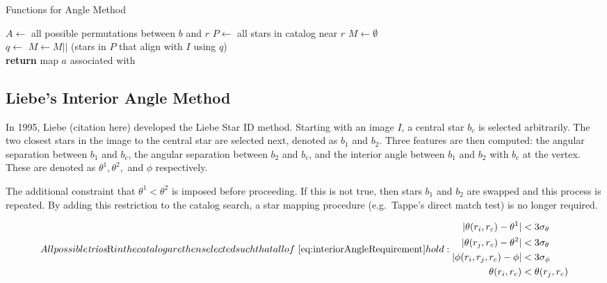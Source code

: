 \begin{algorithm}
    \caption{Functions for Angle Method}\label{algorithm:angleHelper}
    \begin{algorithmic}[1]
        \State $A \gets $ all possible permutations between $b$ and $r$
        \State $P \gets $ all stars in catalog near $r$
        \State $M \gets \emptyset$
        \\
        \State $q \gets $ 
        \State $M \gets M ||$ (stars in $P$ that align with $I$ using $q$)
        \EndFor
        \\
        \State \textbf{return} map $a$ associated with 
        \EndFunction
    \end{algorithmic}
\end{algorithm}

\subsection{Liebe's Interior Angle Method}\label{subsec:liebe'sInteriorAngleMethod}
In 1995, Liebe (citation here) developed the Liebe Star ID method.
Starting with an image $I$, a central star $b_c$ is selected arbitrarily.
The two closest stars in the image to the central star are selected next, denoted as $b_1$ and $b_2$.
Three features are then computed: the angular separation between $b_1$ and $b_c$, the angular separation between
$b_2$ and $b_c$, and the interior angle between $b_1$ and $b_2$ with $b_c$ at the vertex.
These are denoted as $\theta^1, \theta^2,$ and $\phi$ respectively.

The additional constraint that $\theta^1 < \theta^2$ is imposed before proceeding.
If this is not true, then stars $b_1$ and $b_2$ are swapped and this process is repeated.
By adding this restriction to the catalog search, a star mapping procedure (e.g.\ Tappe's direct match test) is no
longer required.

\begin{subequations}
    \label{eq:interiorAngleRequirement}

    All possible \textit{trios} $R$ in the catalog are then selected such that all
    of~\autoref{eq:interiorAngleRequirement} hold:
    \begin{align}
        |\theta(r_i, r_c) - \theta^1| &< 3 \sigma_{\theta} \\
        |\theta(r_j, r_c) - \theta^2| &< 3 \sigma_{\theta} \\
        |\phi(r_i, r_j, r_c) - \phi| &< 3 \sigma_{\phi} \\
        \theta(r_i, r_c) &< \theta(r_j, r_c)
    \end{align}
\end{subequations}

